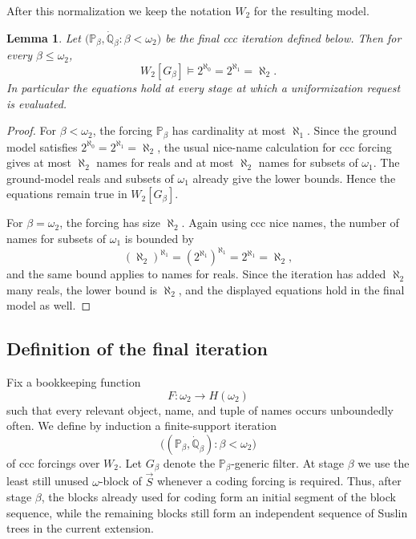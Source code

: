 \documentclass[a4paper,11pt]{article}
\newtheorem{lemma}[theorem]{Lemma}
\newcommand{\forceP}{\mathbb{P}}
\newcommand{\forceQ}{\mathbb{Q}}
\begin{document}
After this normalization we keep the notation $W_2$ for the resulting model.

\begin{lemma}\label{lemma:cardinal-equations-at-stages}
Let $\bigl(\forceP_\beta,\dot{\forceQ}_\beta:\beta<\omega_2\bigr)$ be the final ccc iteration defined below.  Then for every $\beta\leq\omega_2$,
\[
   W_2[G_\beta]\models 2^{\aleph_0}=2^{\aleph_1}=\aleph_2.
\]
In particular the equations hold at every stage at which a uniformization request is evaluated.
\end{lemma}

\begin{proof}
For $\beta<\omega_2$, the forcing $\forceP_\beta$ has cardinality at most $\aleph_1$.  Since the ground model satisfies $2^{\aleph_0}=2^{\aleph_1}=\aleph_2$, the usual nice-name calculation for ccc forcing gives at most $\aleph_2$ names for reals and at most $\aleph_2$ names for subsets of $\omega_1$.  The ground-model reals and subsets of $\omega_1$ already give the lower bounds.  Hence the equations remain true in $W_2[G_\beta]$.

For $\beta=\omega_2$, the forcing has size $\aleph_2$.  Again using ccc nice names, the number of names for subsets of $\omega_1$ is bounded by
\[
   (\aleph_2)^{\aleph_1}=(2^{\aleph_1})^{\aleph_1}=2^{\aleph_1}=\aleph_2,
\]
and the same bound applies to names for reals.  Since the iteration has added $\aleph_2$ many reals, the lower bound is $\aleph_2$, and the displayed equations hold in the final model as well.
\end{proof}

\subsection{Definition of the final iteration}

Fix a bookkeeping function
\[
F:\omega_2\longrightarrow H(\omega_2)
\]
such that every relevant object, name, and tuple of names occurs unboundedly often.  We define by induction a finite-support iteration
\[
\bigl((\forceP_\beta,\dot{\forceQ}_\beta):\beta<\omega_2\bigr)
\]
of ccc forcings over $W_2$.  Let $G_\beta$ denote the $\forceP_\beta$-generic filter.  At stage $\beta$ we use the least still unused $\omega$-block of $\vec S$ whenever a coding forcing is required.  Thus, after stage $\beta$, the blocks already used for coding form an initial segment of the block sequence, while the remaining blocks still form an independent sequence of Suslin trees in the current extension.
\end{document}
